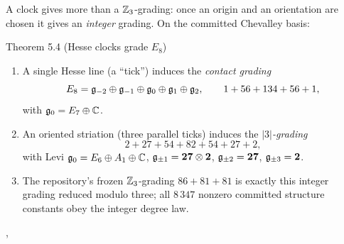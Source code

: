A clock gives more than a $\mathbb{Z}_3$-grading: once an origin and an orientation are chosen it
gives an \emph{integer} grading. On the committed Chevalley basis:

\begin{result}{Theorem 5.4 (Hesse clocks grade $E_8$) \hfill \tierC}
\begin{enumerate}[label=(\roman*),leftmargin=1.5em]
\item A single Hesse line (a ``tick'') induces the \emph{contact grading}
      \[ E_8=\mathfrak{g}_{-2}\oplus\mathfrak{g}_{-1}\oplus\mathfrak{g}_0\oplus\mathfrak{g}_1\oplus\mathfrak{g}_2,\qquad 1+56+134+56+1, \]
      with $\mathfrak{g}_0=E_7\oplus\mathbb{C}$.
\item An oriented striation (three parallel ticks) induces the \emph{$|3|$-grading}
      \[ 2+27+54+82+54+27+2, \]
      with Levi $\mathfrak{g}_0=E_6\oplus A_1\oplus\mathbb{C}$, $\mathfrak{g}_{\pm1}=\mathbf{27}\otimes\mathbf2$,
      $\mathfrak{g}_{\pm2}=\mathbf{27}$, $\mathfrak{g}_{\pm3}=\mathbf2$.
\item The repository's frozen $\mathbb{Z}_3$-grading $86+81+81$ is exactly this integer grading
      reduced modulo three; all $8\,347$ nonzero committed structure constants obey the
      integer degree law.
\end{enumerate}
,
\end{result}


